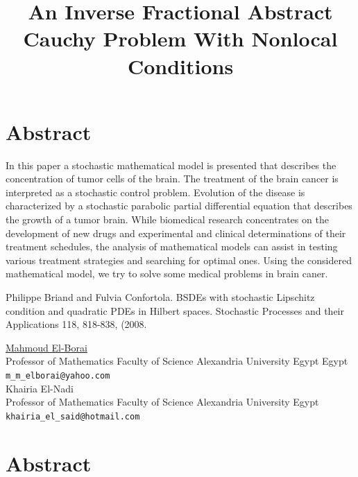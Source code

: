 \documentclass[article, A4, 11pt]{llncs}%
\begin{document}
\section*{Abstract}

In this paper a stochastic mathematical model is presented that describes the concentration of tumor cells of the brain. The treatment of the brain cancer is interpreted as a stochastic  control problem. Evolution of the disease is characterized by a stochastic parabolic partial differential equation that describes the growth of a tumor brain. While biomedical research concentrates on the development of new drugs and experimental and clinical determinations of their treatment schedules, the analysis of mathematical models can assist in testing various treatment strategies and searching for optimal ones. Using the considered mathematical model, we try to solve some medical problems in brain caner.



\begin{thebibliography}{10}
{\sc Philippe Briand and Fulvia Confortola}. {BSDEs with stochastic Lipschitz condition and quadratic PDEs in Hilbert spaces}. Stochastic Processes and their Applications 118, 818-838, (2008.
\end{thebibliography} %

\title{An Inverse Fractional Abstract Cauchy Problem With Nonlocal Conditions}
 \author{} \institute{}
\maketitle
\begin{center}
{\large \underline{Mahmoud El-Borai}}\\
Professor of Mathematics Faculty of Science Alexandria University Egypt Egypt\\
{\tt \tt m\_m\_elborai@yahoo.com}
\\ \vspace{4mm}
{\large Khairia El-Nadi}\\
Professor of Mathematics Faculty of Science Alexandria University  Egypt\\
{\tt \tt khairia\_el\_said@hotmail.com}
\end{center}

\section*{Abstract}
\end{document}
